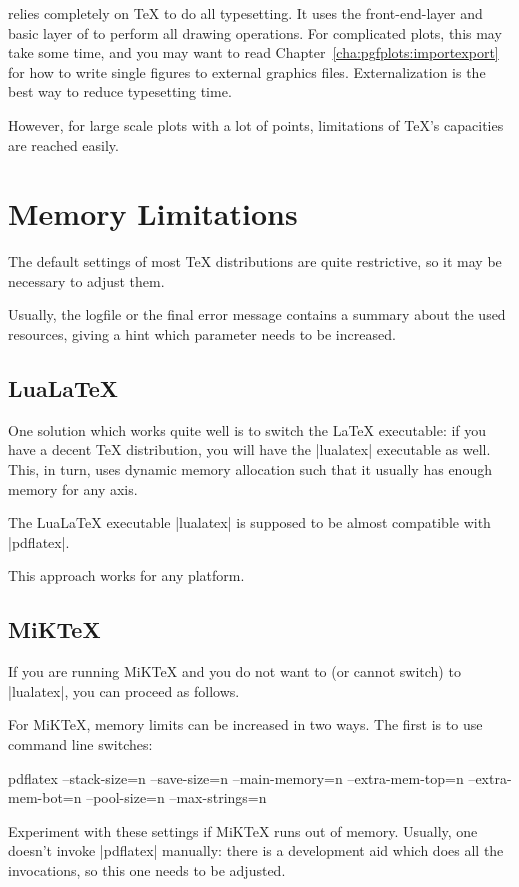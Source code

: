 {\PGFPlots{} relies completely on \TeX{} to do all typesetting. It uses the
front-end-layer and basic layer of \PGF{} to perform all drawing operations.
For complicated plots, this may take some time, and you may want to read
Chapter~\ref{cha:pgfplots:importexport} for how to write single figures to
external graphics files. Externalization is the best way to reduce typesetting
time.

However, for large scale plots with a lot of points, limitations of \TeX's
capacities are reached easily.


\section{Memory Limitations}

The default settings of most \TeX{} distributions are quite restrictive, so it
may be necessary to adjust them.

Usually, the logfile or the final error message contains a summary about the
used resources, giving a hint which parameter needs to be increased.


\subsection{Lua\LaTeX{}}

One solution which works quite well is to switch the \LaTeX{} executable: if
you have a decent \TeX{} distribution, you will have the |lualatex| executable
as well. This, in turn, uses dynamic memory allocation such that it usually has
enough memory for any \PGFPlots{} axis.

The Lua\LaTeX{} executable |lualatex| is supposed to be almost compatible with
|pdflatex|.

This approach works for any platform.


\subsection{MiK\TeX{}}

If you are running MiK\TeX{} and you do not want to (or cannot switch) to
|lualatex|, you can proceed as follows.

For MiK\TeX{}, memory limits can be increased in two ways. The first is to use
command line switches:
%
\begin{codeexample}
pdflatex
    --stack-size=n --save-size=n
    --main-memory=n --extra-mem-top=n --extra-mem-bot=n
    --pool-size=n --max-strings=n
\end{codeexample}
%
\noindent Experiment with these settings if MiK\TeX{} runs out of memory.
Usually, one doesn't invoke |pdflatex| manually: there is a development aid
which does all the invocations, so this one needs to be adjusted.

}
